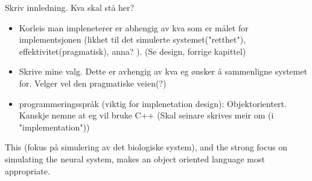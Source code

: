 






Skriv innledning. Kva skal stå her?
\begin{itemize}
	\item Korleis man impleneterer er abhengig av kva som er målet for implementsjonen (likhet til det simulerte systemet("retthet"), effektivitet(pragmatisk), anna? ). (Se design, forrige kapittel)%
	\item Skrive mine valg. Dette er avhengig av kva eg ønsker å sammenligne systemet for. Velger vel den pragmatiske veien(?)
	\item programmeringsspråk (viktig for implenetation design): Objektorientert. Kanskje nemne at eg vil bruke C++ (Skal seinare skrives meir om (i "implementation"))
\end{itemize}

	This (fokus på simulering av det biologiske system), and the strong focus on simulating the neural system, makes an object oriented language most appropriate. 



